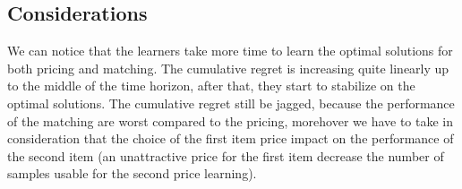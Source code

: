 \subsection*{Considerations}
We can notice that the learners take more time to learn the optimal solutions for both pricing and matching. The cumulative regret is increasing quite linearly up to the middle of the time horizon, after that, they start to stabilize on the optimal solutions. The cumulative regret still be jagged, because the performance of the matching are worst compared to the pricing, morehover we have to take in consideration that the choice of the first item price impact on the performance of the second item (an unattractive price for the first item decrease the number of samples usable for the second price learning).